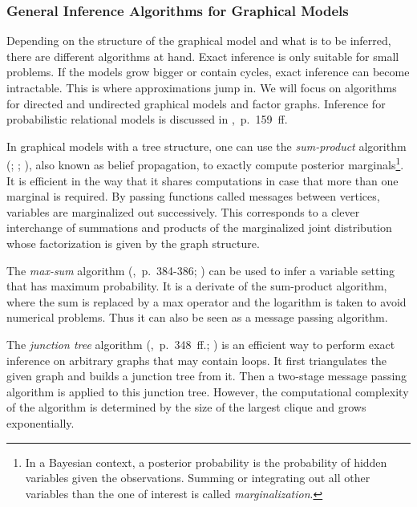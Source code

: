 \subsubsection{General Inference Algorithms for Graphical Models}

Depending on the structure of the graphical model and what is to be inferred, there are different algorithms at hand. Exact inference is only suitable for small problems. If the models grow bigger or contain cycles, exact inference can become intractable. This is where approximations jump in. We will focus on algorithms for directed and undirected graphical models and factor graphs. Inference for probabilistic relational models is discussed in \textcite{getoor2007introduction},~p.~159~ff.

In graphical models with a tree structure, one can use the \emph{sum-product} algorithm (\cite{pearl1988probabilistic}; \cite{kim1983computational}; \cite{pearl1982reverend}), also known as belief propagation, to exactly compute posterior marginals\footnote{In a Bayesian context, a posterior probability is the probability of hidden variables given the observations. Summing or integrating out all other variables than the one of interest is called \emph{marginalization}.}. It is efficient in the way that it shares computations in case that more than one marginal is required. By passing functions called messages between vertices, variables are marginalized out successively. This corresponds to a clever interchange of summations and products of the marginalized joint distribution whose factorization is given by the graph structure.

The \emph{max-sum} algorithm (\cite{bishop2006pattern},~p.~384-386; \cite{dawid1992applications}) can be used to infer a variable setting that has maximum probability. It is a derivate of the sum-product algorithm, where the sum is replaced by a max operator and the logarithm is taken to avoid numerical problems. Thus it can also be seen as a message passing algorithm.

The \emph{junction tree} algorithm (\cite{koller2009probabilistic},~p.~348~ff.; \cite{lauritzen1988local}) is an efficient way to perform exact inference on arbitrary graphs that may contain loops. It first triangulates the given graph and builds a junction tree from it. Then a two-stage message passing algorithm is applied to this junction tree. However, the computational complexity of the algorithm is determined by the size of the largest clique and grows exponentially.

